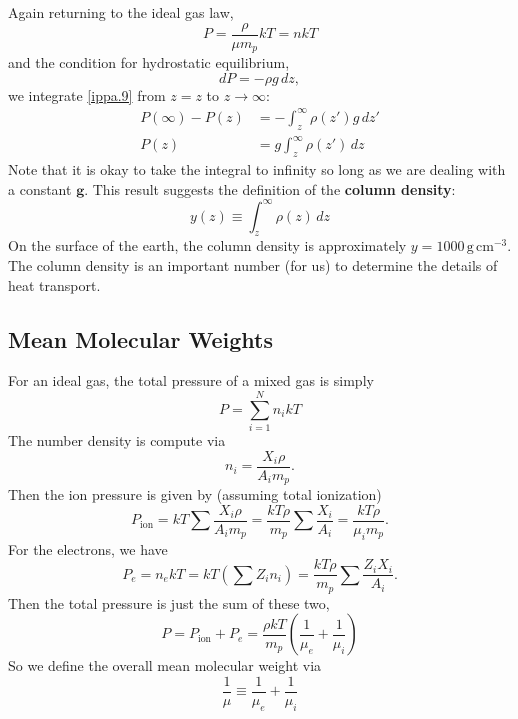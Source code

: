 \documentclass[10pt]{article}
\newcommand{\n}{\noindent}
\begin{document}
	\n Again returning to the ideal gas law,
	\begin{equation}
		\label{ippa.8} P=\frac{\rho}{\mu m_p}kT=nkT
	\end{equation}
	and the condition for hydrostatic equilibrium,
	\begin{equation}
		\label{ippa.9} dP=-\rho g\,dz,
	\end{equation}
	we integrate \eqref{ippa.9} from $z=z$ to $z\to \infty$:
	\begin{align}
		\label{ippa.10} P(\infty)-P(z)&=-\int_z^\infty \rho(z') g\,dz'\\
		\label{ippa.11} P(z) &= g\int_z^\infty \rho(z')\,dz
	\end{align}
	Note that it is okay to take the integral to infinity so long as we are dealing with a constant $\mathbf{g}$. This result suggests the definition of the \textbf{column density}:
	\begin{equation}
		\label{ippa.12} y(z)\equiv \int_z^\infty \rho(z)\,dz
	\end{equation}
	On the surface of the earth, the column density is approximately $y=1000\,\mathrm{g\,cm^{-3}}$. The column density is an important number (for us) to determine the details of heat transport.
	\subsection{Mean Molecular Weights}
	For an ideal gas, the total pressure of a mixed gas is simply
	\begin{equation}
		\label{mmw.1} P=\sum_{i=1}^N n_ikT
	\end{equation}
	The number density is compute via
	\begin{equation}
		\label{mmw.2} n_i=\frac{X_i\rho}{A_im_p}.
	\end{equation}
	Then the ion pressure is given by (assuming total ionization)
	\begin{equation}
		\label{mmw.3} P_{\mathrm{ion}}=kT\sum\frac{X_i\rho}{A_im_p}=\frac{kT\rho}{m_p}\sum\frac{X_i}{A_i}=\frac{kT\rho}{\mu_im_p}.
	\end{equation}
	For the electrons, we have
	\begin{equation}
		\label{mmw.4} P_e=n_ekT=kT\left(\sum Z_in_i\right)=\frac{kT\rho}{m_p}\sum\frac{Z_iX_i}{A_i}.
	\end{equation}
	Then the total pressure is just the sum of these two,
	\begin{equation}
		\label{mmw.5} P=P_{\mathrm{ion}}+P_e=\frac{\rho kT}{m_p}\left(\frac{1}{\mu_e}+\frac{1}{\mu_i}\right)
	\end{equation}
	So we define the overall mean molecular weight via
	\begin{equation}
		\frac{1}{\mu}\equiv \frac{1}{\mu_e}+\frac{1}{\mu_i}
	\end{equation}
	
\end{document}
